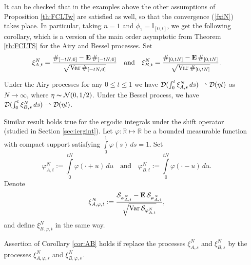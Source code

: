\documentclass{article}
\numberwithin{equation}{section}
\newcommand{\mR}{\mathbb{R}}
\newcommand{\mI}{\mathbb{I}}
\newcommand{\DD}{{\cal D}}
\newcommand{\NN}{{\cal N}}
\newcommand{\SSS}{{\cal S}}
\newcommand{\ph}{\varphi}
\newcommand{\Var}{\operatorname{Var}}
\newcommand{\MO}{\mbox{\bf E}\,}
\newcommand{\ra}{\rightarrow}
\newcommand{\volna}{\thicksim}
\newcommand{\raw}{\rightharpoonup}
\newcommand{\fr}{\frac}
\newcommand{\qnd}{\quad\mbox{and}\quad}
\newcommand{\ili}{\int\limits}
\newcommand{\lbl}{\label}
\newcommand{\rprop}{Proposition \nolinebreak}
\newcommand{\rtheo}{Theorem \nolinebreak}
\newcommand{\rsec}{Section \nolinebreak}
\begin{document}
It can be checked that in the examples above
the other assumptions of \rprop \ref{th:FCLTw}
are satisfied as well,
so that the convergence (\ref{fxiN}) takes place.
In particular,
taking $n=1$ and $\phi_1=\mI_{[0,t]}$,
we get  the following corollary,
which is a version of the main order asymptotic
from \rtheo\ref{th:FCLTS} for the Airy and Bessel processes.
Set
$$
\xi^N_{A,t}
	=\fr{\#_{[-tN,0]}-\MO\#_{[-tN,0]}}{\sqrt{\Var \#_{[-tN,0]}}}
\qnd
\xi^N_{B,t}
	=\fr{\#_{[0,tN]}-\MO\#_{[0,tN]}}{\sqrt{\Var \#_{[0,tN]}}}.
$$
\begin{cor}\lbl{cor:AB}
Under the Airy processes for any $0\leq t\leq 1$ we have
$\DD(\int_0^t \xi_{A,s}^N \,ds)\raw \DD(\eta t)$ as $N\ra\infty$,
where $\eta\volna\NN(0,1/2)$.
Under the Bessel process, we have $\DD(\int_0^t \xi_{B,s}^N \,ds)\raw \DD(\eta t)$.
\end{cor}



Similar result holds true for the ergodic integrals
under the shift operator (studied in \rsec\ref{sec:iergint}).
Let $\ph:\mR\mapsto\mR$ be a bounded measurable function with compact support
satisfying $\ili_0^1\ph(s)\,ds=1$.
Set
$$
\ph_{A,t}^N:=\ili_0^{tN} \ph(\cdot+u)\,du
\qnd
\ph_{B,t}^N:=\ili_0^{tN} \ph(\cdot-u)\,du.
$$
Denote
$$
\xi_{A,\ph,t}^N:=\fr{\SSS_{\ph^N_{A,t}} - \MO\SSS_{\ph^N_{A,t}}}{\sqrt{\Var\SSS_{\ph^N_{A,t}}}},
$$
and define  $\xi_{B,\ph,t}^N$ in the same way.
\begin{cor}
Assertion of Corollary \ref{cor:AB} holds if replace the processes
$\xi_{A,s}^N$ and $\xi_{B,s}^N$
by the processes $\xi_{A,\ph,s}^N$ and $\xi_{B,\ph,s}^N$.
\end{cor}





\end{document}
